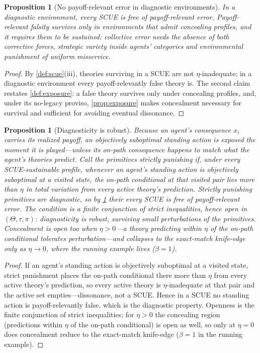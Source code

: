 \documentclass[11pt]{article}
\newtheorem{proposition}[assumption]{Proposition}
\theoremstyle{definition}
\begin{document}
\begin{proposition}[No payoff-relevant error in diagnostic environments]
\label{prop:diagnostic}
In a diagnostic environment, every SCUE is free of payoff-relevant error.
Payoff-relevant falsity survives only in environments that admit concealing profiles, and it requires them to be sustained: collective error needs the absence of \emph{both} corrective forces, strategic variety inside agents' categories and environmental punishment of uniform misservice.
\end{proposition}

\begin{proof}
By \cref{def:scue}(iii), theories surviving in a SCUE are not $\eta$-inadequate; in a diagnostic environment every payoff-relevantly false theory is.
The second claim restates \cref{def:exposure}: a false theory survives only under concealing profiles, and, under its no-legacy proviso, \cref{prop:exposure} makes concealment necessary for survival and sufficient for avoiding eventual dissonance.
\end{proof}

\begin{proposition}[Diagnosticity is robust]
\label{prop:punishing}
Because an agent's consequence $x_i$ carries its realized payoff, an objectively suboptimal standing action is exposed the moment it is played---unless its on-path consequence happens to match what the agent's theories predict.
Call the primitives \emph{strictly punishing} if, under every SCUE-sustainable profile, whenever an agent's standing action is objectively suboptimal at a visited state, the on-path conditional at that visited pair lies more than $\eta$ in total variation from every active theory's prediction.
Strictly punishing primitives are diagnostic, so by \cref{prop:diagnostic} their every SCUE is free of payoff-relevant error.
The condition is a finite conjunction of strict inequalities, hence open in $(\Theta,\tau,\pi)$: diagnosticity is \emph{robust}, surviving small perturbations of the primitives.
Concealment is open too when $\eta>0$---a theory predicting within $\eta$ of the on-path conditional tolerates perturbation---and collapses to the exact-match knife-edge only as $\eta\to0$, where the running example lives ($\beta=1$).
\end{proposition}

\begin{proof}
If an agent's standing action is objectively suboptimal at a visited state, strict punishment places the on-path conditional there more than $\eta$ from every active theory's prediction, so every active theory is $\eta$-inadequate at that pair and the active set empties---dissonance, not a SCUE.
Hence in a SCUE no standing action is payoff-relevantly false, which is the diagnostic property.
Openness is the finite conjunction of strict inequalities; for $\eta>0$ the concealing region (predictions within $\eta$ of the on-path conditional) is open as well, so only at $\eta=0$ does concealment reduce to the exact-match knife-edge ($\beta=1$ in the running example).
\end{proof}
\end{document}
